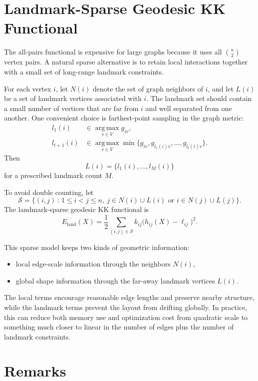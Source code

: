\documentclass[11pt]{article}
\begin{document}
\section*{Landmark-Sparse Geodesic KK Functional}

The all-pairs functional is expensive for large graphs because it uses all $\binom{n}{2}$
vertex pairs. A natural sparse alternative is to retain local interactions together with a small
set of long-range landmark constraints.

For each vertex $i$, let $N(i)$ denote the set of graph neighbors of $i$, and let $L(i)$ be a
set of landmark vertices associated with $i$. The landmark set should contain a small number
of vertices that are far from $i$ and well separated from one another. One convenient choice
is farthest-point sampling in the graph metric:
\begin{align*}
l_1(i)
&\in \operatorname*{arg\,max}_{v\in V} g_{iv}, \\
l_{t+1}(i)
&\in \operatorname*{arg\,max}_{v\in V}
\min\bigl\{g_{iv}, g_{l_1(i)v}, \dots, g_{l_t(i)v}\bigr\}.
\end{align*}
Then
\[
L(i) = \{l_1(i),\dots,l_M(i)\}
\]
for a prescribed landmark count $M$.

To avoid double counting, let
\[
\mathcal{S}
=
\bigl\{(i,j)\,:\, 1\le i<j\le n,\ \text{$j\in N(i)\cup L(i)$ or $i\in N(j)\cup L(j)$}\bigr\}.
\]
The landmark-sparse geodesic KK functional is
\[
E_{\mathrm{land}}(X)
=
\frac{1}{2}\sum_{(i,j)\in\mathcal{S}}
k_{ij}\bigl(h_{ij}(X)-\ell_{ij}\bigr)^2.
\]

This sparse model keeps two kinds of geometric information:
\begin{itemize}
\item local edge-scale information through the neighbors $N(i)$,
\item global shape information through the far-away landmark vertices $L(i)$.
\end{itemize}

The local terms encourage reasonable edge lengths and preserve nearby structure, while the
landmark terms prevent the layout from drifting globally. In practice, this can reduce both
memory use and optimization cost from quadratic scale to something much closer to linear
in the number of edges plus the number of landmark constraints.

\section*{Remarks}
\end{document}

